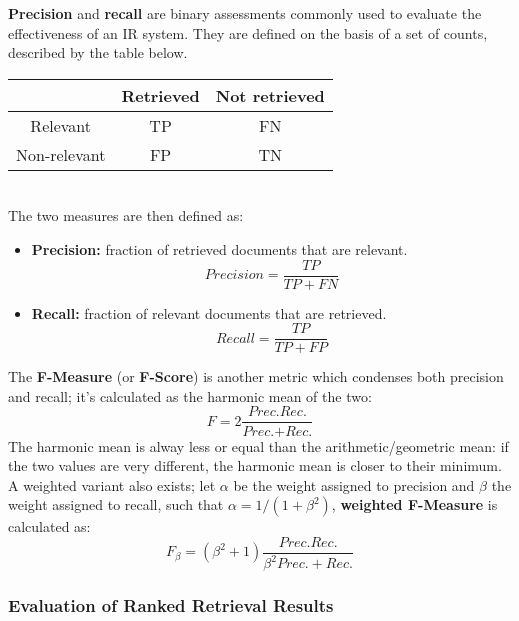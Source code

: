 \textbf{Precision} and \textbf{recall} are binary assessments commonly used to evaluate the effectiveness of an IR system. They are defined on the basis of a set of counts, described by the table below.
\begin{table}[ht]
    \centering
    \begin{tabular}{|c|c|c|}
         \hline
         & Retrieved & Not retrieved \\
        \hline
        Relevant & TP & FN \\
        \hline
        Non-relevant & FP & TN \\
        \hline
    \end{tabular}
\end{table} \\
The two measures are then defined as:
\begin{itemize}
    \item \textbf{Precision:} fraction of retrieved documents that are relevant.
    \begin{equation*}
            \textit{Precision} = \frac{TP}{TP + FN}
    \end{equation*}
    
    \item \textbf{Recall:} fraction of relevant documents that are retrieved.
    \begin{equation*}
        \textit{Recall} = \frac{TP}{TP + FP}
    \end{equation*}
\end{itemize}
The \textbf{F-Measure} (or \textbf{F-Score}) is another metric which condenses both precision and recall; it's calculated as the harmonic mean of the two:
\begin{equation*}
    F = 2 \frac{\textit{Prec.}\textit{Rec.}}{\textit{Prec.} + \textit{Rec.}}
\end{equation*}
The harmonic mean is alway less or equal than the arithmetic/geometric mean: if the two values are very different, the harmonic mean is closer to their minimum. A weighted variant also exists; let $\alpha$ be the weight assigned to precision and $\beta$ the weight assigned to recall, such that $\alpha = 1/(1+\beta^2)$, \textbf{weighted F-Measure} is calculated as:
\begin{equation*}
    F_{\beta} = (\beta^2 + 1)\frac{\textit{Prec.}\textit{Rec.}}{\beta^2 \textit{Prec.} + \textit{Rec.}}
\end{equation*}

\subsubsection{Evaluation of Ranked Retrieval Results}

